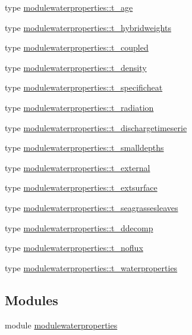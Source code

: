 \begin{DoxyCompactItemize}
\item 
type \mbox{\hyperlink{structmodulewaterproperties_1_1t__age}{modulewaterproperties\+::t\+\_\+age}}
\item 
type \mbox{\hyperlink{structmodulewaterproperties_1_1t__hybridweights}{modulewaterproperties\+::t\+\_\+hybridweights}}
\item 
type \mbox{\hyperlink{structmodulewaterproperties_1_1t__coupled}{modulewaterproperties\+::t\+\_\+coupled}}
\item 
type \mbox{\hyperlink{structmodulewaterproperties_1_1t__density}{modulewaterproperties\+::t\+\_\+density}}
\item 
type \mbox{\hyperlink{structmodulewaterproperties_1_1t__specificheat}{modulewaterproperties\+::t\+\_\+specificheat}}
\item 
type \mbox{\hyperlink{structmodulewaterproperties_1_1t__radiation}{modulewaterproperties\+::t\+\_\+radiation}}
\item 
type \mbox{\hyperlink{structmodulewaterproperties_1_1t__dischargetimeserie}{modulewaterproperties\+::t\+\_\+dischargetimeserie}}
\item 
type \mbox{\hyperlink{structmodulewaterproperties_1_1t__smalldepths}{modulewaterproperties\+::t\+\_\+smalldepths}}
\item 
type \mbox{\hyperlink{structmodulewaterproperties_1_1t__external}{modulewaterproperties\+::t\+\_\+external}}
\item 
type \mbox{\hyperlink{structmodulewaterproperties_1_1t__extsurface}{modulewaterproperties\+::t\+\_\+extsurface}}
\item 
type \mbox{\hyperlink{structmodulewaterproperties_1_1t__seagrassesleaves}{modulewaterproperties\+::t\+\_\+seagrassesleaves}}
\item 
type \mbox{\hyperlink{structmodulewaterproperties_1_1t__ddecomp}{modulewaterproperties\+::t\+\_\+ddecomp}}
\item 
type \mbox{\hyperlink{structmodulewaterproperties_1_1t__noflux}{modulewaterproperties\+::t\+\_\+noflux}}
\item 
type \mbox{\hyperlink{structmodulewaterproperties_1_1t__waterproperties}{modulewaterproperties\+::t\+\_\+waterproperties}}
\end{DoxyCompactItemize}
\subsection*{Modules}
\begin{DoxyCompactItemize}
\item 
module \mbox{\hyperlink{namespacemodulewaterproperties}{modulewaterproperties}}
\end{DoxyCompactItemize}
